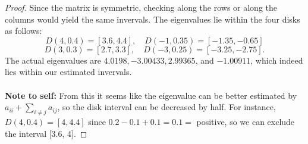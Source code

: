 \begin{proof}
Since the matrix is symmetric, checking along the rows or along the columns would yield the same invervals. The eigenvalues lie within the four disks as follows:
$$D(4, 0.4) = [3.6, 4.4], \quad D(-1, 0.35) = [-1.35, -0.65]$$
$$ D(3, 0.3) = [2.7, 3.3], \quad D(-3, 0.25) = [-3.25, -2.75].$$
The actual eigenvalues are $4.0198, -3.00433, 2.99365$, and $-1.00911$, which indeed lies within our estimated invervals. \\
\\
\textbf{Note to self:} From this it seems like the eigenvalue can be better estimated by $a_{ii} + \sum_{i \neq j} a_{ij} $, so the disk interval can be decreased by half. For instance, $ D(4,0.4) = [4, 4.4]$ since $0.2-0.1+0.1 = 0.1 =$ positive, so we can exclude the interval [3.6, 4].

\end{proof}